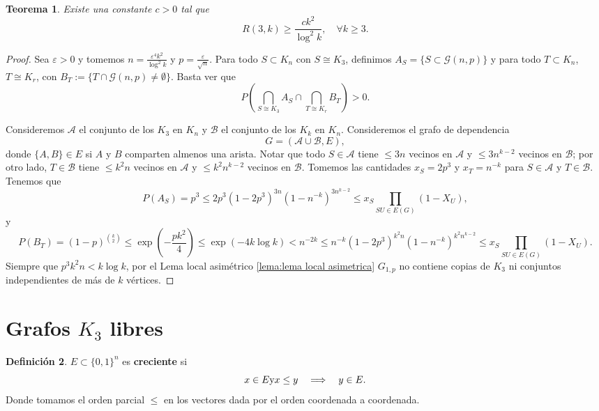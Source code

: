 \documentclass[12pt]{report}
\theoremstyle{plain}
\newtheorem{theorem}{Teorema}[section]
\theoremstyle{definition}
\newtheorem{definition}[theorem]{Definición}
\begin{document}
\begin{theorem}
Existe una constante $c > 0$ tal que
\[
    R(3, k) \geq \frac{c k^2}{\log^2 k}, \quad \forall k \geq 3.
\]
\end{theorem}
\begin{proof}
Sea $\varepsilon > 0$ y tomemos $n = \frac{\varepsilon^4 k ^2}{\log^2 k}$ y $p = \frac{\varepsilon}{\sqrt n}$. Para todo $S \subset K_n$ con $S \cong K_3$, definimos $A_S = \{ S \subset \mathcal G (n,p)\}$ y para todo $T \subset K_n$, $T \cong K_r$, con $B_T := \{ T \cap \mathcal G (n,p) \neq \emptyset\}$. Basta ver que
\[
    P (\bigcap_{S \cong K_3} A_S \cap \bigcap_{T \cong K_r} B_T) > 0.
\]

Consideremos $\mathcal A$ el conjunto de los $K_3$ en $K_n$ y $\mathcal B$ el conjunto de los $K_k$ en $K_n$. Consideremos el grafo de dependencia
\[
    G = ( \mathcal A \cup \mathcal B, E),
\]
donde $\{A, B\} \in E$ si $A$ y $B$ comparten almenos una arista. Notar que todo $S \in \mathcal A$ tiene $\leq 3n$ vecinos en $\mathcal A$ y $\leq 3n^{k-2}$ vecinos en $\mathcal B$; por otro lado, $T \in \mathcal B$ tiene $\leq k^2 n$ vecinos en $\mathcal A$ y $\leq k^2 n^{k-2}$ vecinos en $\mathcal B$. Tomemos las cantidades $x_S = 2p^3$ y $x_T = n^{-k}$ para $S \in \mathcal A$ y $T \in \mathcal B$. Tenemos que
\[
    P(A_S) = p^3 \leq 2 p^3 (1-2p^3)^{3n} (1-n^{-k})^{3 n^{k-2}} \leq x_S \prod_{S U \in E(G)} (1- X_U),
\]
y
\[
    P(B_T) = (1-p)^{\binom k 2} \leq \exp (- \frac{p k ^2}{4}) \leq \exp (-4k \log k) < n^{-2k} \leq n^{-k}(1-2 p^3)^{k^2n} (1- n^{-k})^{k^2 n^{k-2}} \leq x_S \prod_{S U \in E(G)} (1-X_U).
\]
Siempre que $p^3 k^2 n< k \log k$, por el Lema local asimétrico \ref{lema:lema local asimetrica} $G_{1,p}$ no contiene copias de $K_3$ ni conjuntos independientes de más de $k$ vértices.
\end{proof}





\section{Grafos $K_3$ libres}

\begin{definition}
    $E \subset \{0,1\}^n$ es \textbf{creciente} si
    \[
    x \in E \text y x \leq y \quad \Longrightarrow \quad y \in E.
    \]
    Donde tomamos el orden parcial $\leq$ en los vectores dada por el orden coordenada a coordenada.

\end{definition}
\end{document}
